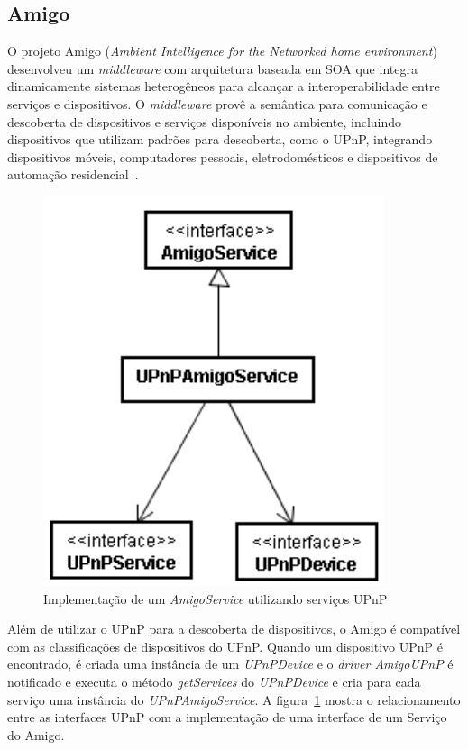 \subsection{Amigo}
O projeto Amigo (\emph{Ambient Intelligence for the Networked home environment}) desenvolveu um \emph{middleware} com arquitetura baseada em SOA que integra dinamicamente sistemas heterogêneos para alcançar a interoperabilidade entre serviços e dispositivos. O \emph{middleware} provê a semântica para comunicação e descoberta de dispositivos e serviços disponíveis no ambiente, incluindo dispositivos que utilizam padrões para descoberta, como o UPnP, integrando dispositivos móveis, computadores pessoais, eletrodomésticos e dispositivos de automação residencial~\cite{amigoArch}.

\begin{figure}[ht]
\center
\includegraphics[scale=0.5]{imagens/amigo-interfaces}
\caption{Implementação de um \emph{AmigoService} utilizando serviços UPnP~\cite{amigoCore}}
\label{fig:amigoInterfaces}
\end{figure}

Além de utilizar o UPnP para a descoberta de dispositivos, o Amigo é compatível com as classificações de dispositivos do UPnP. Quando um dispositivo UPnP é encontrado, é criada uma instância de um \emph{UPnPDevice} e o \emph{driver AmigoUPnP} é notificado e executa o método \emph{getServices} do \emph{UPnPDevice} e cria para cada serviço uma instância do \emph{UPnPAmigoService}. A figura~\ref{fig:amigoInterfaces} mostra o relacionamento entre as interfaces UPnP com a implementação de uma interface de um Serviço do Amigo.

